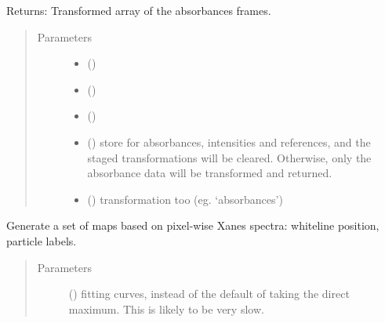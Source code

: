 \documentclass[letterpaper,10pt,english]{sphinxmanual}
\begin{document}
\begin{fulllineitems}
\begin{fulllineitems}
Returns: Transformed array of the absorbances frames.
\begin{quote}\begin{description}
\item[{Parameters}] \leavevmode\begin{itemize}
\item {} 
 (\sphinxstyleliteralemphasis{-}) \textendash{} 

\item {} 
\sphinxstyleliteralstrong{, } (\sphinxstyleliteralemphasis{,}) \textendash{} 

\item {} 
 () \textendash{} 

\item {} 
 (\sphinxstyleliteralemphasis{-}) \textendash{} store for absorbances, intensities and references, and the
staged transformations will be cleared. Otherwise, only the
absorbance data will be transformed and returned.

\item {} 
 (\sphinxstyleliteralemphasis{-}) \textendash{} transformation too (eg. ‘absorbances’)

\end{itemize}

\end{description}\end{quote}

\end{fulllineitems}


\begin{fulllineitems}
\label{\detokenize{xanespy:xanespy.xanes_frameset.XanesFrameset.calculate_maps}}
Generate a set of maps based on pixel-wise Xanes spectra: whiteline
position, particle labels.
\begin{quote}\begin{description}
\item[{Parameters}] \leavevmode
{} (\sphinxstyleliteralemphasis{, }) \textendash{} fitting curves, instead of the default of taking the direct
maximum. This is likely to be very slow.


\end{description}
\end{quote}
\end{fulllineitems}
\end{fulllineitems}
\end{document}
